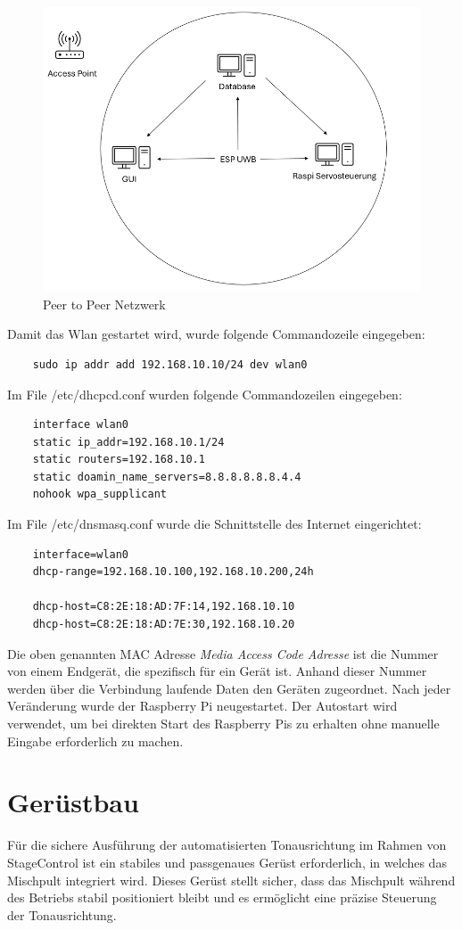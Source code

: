 \begin{figure}[H]
	\centering
	\includegraphics[width=0.5\linewidth]{images/Peer to Peer Netzwerk.png}
	\caption[Peer to Peer Netzwerk]{Peer to Peer Netzwerk}
	\label{fig:Peer to Peer Netzwerk} 
\end{figure}

\newpage
Damit das Wlan gestartet wird, wurde folgende Commandozeile eingegeben: 
\begin{lstlisting}
	sudo ip addr add 192.168.10.10/24 dev wlan0 
\end{lstlisting}

Im File /etc/dhcpcd.conf wurden folgende Commandozeilen eingegeben: 
\begin{lstlisting}
	interface wlan0
	static ip_addr=192.168.10.1/24
	static routers=192.168.10.1
	static doamin_name_servers=8.8.8.8.8.8.4.4
	nohook wpa_supplicant
\end{lstlisting}

Im File /etc/dnsmasq.conf wurde die Schnittstelle des Internet eingerichtet:
\begin{lstlisting}
	interface=wlan0
	dhcp-range=192.168.10.100,192.168.10.200,24h
	
	dhcp-host=C8:2E:18:AD:7F:14,192.168.10.10
	dhcp-host=C8:2E:18:AD:7E:30,192.168.10.20
\end{lstlisting} 

Die oben genannten MAC Adresse \textit{Media Access Code Adresse} ist die Nummer von einem Endgerät, die spezifisch für ein Gerät ist. Anhand dieser Nummer werden über die Verbindung laufende Daten den Geräten zugeordnet. Nach jeder Veränderung wurde der Raspberry Pi neugestartet. Der Autostart wird verwendet, um bei direkten Start des Raspberry Pis zu erhalten ohne manuelle Eingabe erforderlich zu machen.

\newpage
\section{Gerüstbau}
Für die sichere Ausführung der automatisierten Tonausrichtung im Rahmen von StageControl ist ein stabiles und passgenaues Gerüst erforderlich, in welches das Mischpult integriert wird. Dieses Gerüst stellt sicher, dass das Mischpult während des Betriebs stabil positioniert bleibt und es ermöglicht eine präzise Steuerung der Tonausrichtung.


